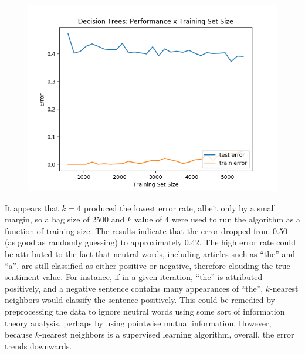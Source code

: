\documentclass[11pt, a4paper]{article} %
\begin{document}
\begin{figure}
\centering
\includegraphics[scale=0.525]{DTTSS.png}
\end{figure}
It appears that $k=4$ produced the lowest error rate, albeit only by a small margin, so a bag size of 2500 and $k$ value of 4 were used to run the algorithm as a function of training size.
The results indicate that the error dropped from 0.50 (as good as randomly guessing) to approximately 0.42. The high error rate could be attributed to the fact that neutral words, including articles such as ``the'' and ``a'', are still classified as either positive or negative, therefore clouding the true sentiment value. For instance, if in a given iteration, ``the'' is attributed positively, and a negative sentence contains many appearances of ``the'', $k$-nearest neighbors would classify the sentence positively. This could be remedied by preprocessing the data to ignore neutral words using some sort of information theory analysis, perhaps by using pointwise mutual information. However, because $k$-nearest neighbors is a supervised learning algorithm, overall, the error trends downwards.
\end{document}
